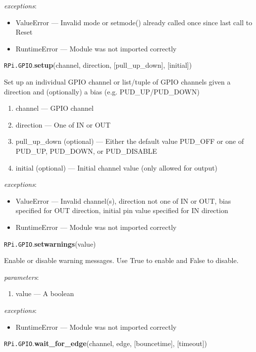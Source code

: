 \documentclass[12pt]{article}
\begin{document}
 
\textit{exceptions}:
\begin{itemize}
    \item ValueError --- Invalid mode or setmode() already called once since last call to Reset
    \item RuntimeError --- Module was not imported correctly 
\end{itemize}

\noindent \texttt{RPi.GPIO}.\textbf{setup}(channel, direction, [pull\_up\_down], [initial])
 
 
Set up an individual GPIO channel or list/tuple of GPIO channels given a direction and (optionally) a bias (e.g. PUD\_UP/PUD\_DOWN)

\begin{enumerate}      
        \item channel --- GPIO channel
        \item direction --- One of IN or OUT
        \item pull\_up\_down (optional) --- Either the default value PUD\_OFF or one of PUD\_UP, PUD\_DOWN, or PUD\_DISABLE
        \item initial (optional) --- Initial channel value (only allowed for output)
\end{enumerate}
 
 
\textit{exceptions}:
\begin{itemize}
    \item ValueError --- Invalid channel(s), direction not one of IN or OUT, bias specified for OUT direction, initial pin value specified for IN direction
    \item RuntimeError --- Module was not imported correctly 
\end{itemize}


\noindent \texttt{RPi.GPIO}.\textbf{setwarnings}(value)
        
Enable or disable warning messages. Use True to enable and False to disable.
        
\textit{parameters}:
\begin{enumerate}      
        \item value --- A boolean
\end{enumerate}
 
 
\textit{exceptions}:
\begin{itemize}
    \item RuntimeError --- Module was not imported correctly 
\end{itemize}

\noindent \texttt{RPi.GPIO}.\textbf{wait\_for\_edge}(channel, edge, [bouncetime], [timeout])
\end{document}
